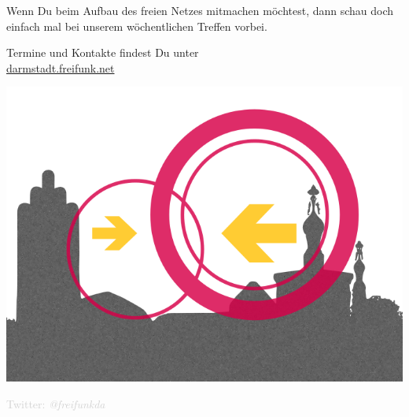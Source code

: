\documentclass[a4paper]{article}
\begin{document}
\vspace{1.3cm}
\begin{Row}
    \begin{Cell}{1}
	Wenn Du beim Aufbau des freien Netzes mitmachen möchtest, dann schau doch einfach mal bei unserem wöchentlichen Treffen vorbei.
	\end{Cell}
\end{Row}
\vspace{0.5cm}
\begin{center}
	\large Termine und Kontakte findest Du unter \\
	\url{darmstadt.freifunk.net}
\end{center}
\begin{center}
\vspace{-0.5cm}
\hspace*{-0.05 \paperwidth}\includegraphics[width=\paperwidth]{../images/logo_skyline_large}

\vspace{-2.7cm}
\large \textcolor{lightgrey}{Twitter: \textit{@freifunkda}}
\end{center}
\end{document}
